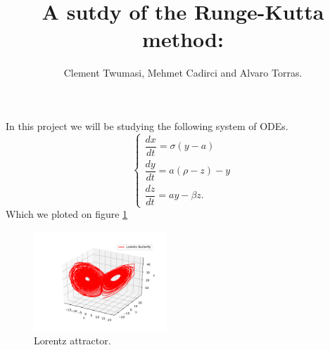 \documentclass{article}
\title{A sutdy of the Runge-Kutta method:}
\author{Clement Twumasi, Mehmet Cadirci and Alvaro Torras.}
\begin{document}
    \maketitle
    In this project we will be studying the following system of ODEs.
    $$
    \begin{cases}
        \dfrac{dx}{dt} = \sigma (y - a) \\
        \dfrac{dy}{dt} = a (\rho - z) - y \\
        \dfrac{dz}{dt} = a y - \beta z.
    \end{cases}
    $$
    Which we ploted on figure \ref{fig:lorentz_attractor}
    \begin{figure}[!hbtp]
    \begin{center}
        \includegraphics[width=5cm]{src/buterfly.pdf}
        \caption{Lorentz attractor.}
        \label{fig:lorentz_attractor}
    \end{center}
\end{figure}
\end{document}

